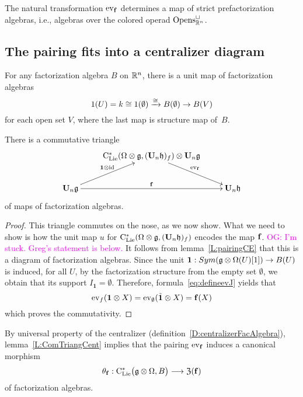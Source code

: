 \documentclass[11pt]{amsart}
\numberwithin{equation}{section}
\def\owen{\textcolor{magenta}{OG: }\textcolor{magenta}}
\begin{document}
\begin{lmm}
\label{L:pairingCE}
The natural transformation ${\rm ev}_{\bf{f}}$ determines a map of strict prefactorization algebras,
i.e., algebras over the colored operad ${\rm Opens}_{\mathbb R^n}^\sqcup$.
\end{lmm}

\subsection{The pairing fits into a centralizer diagram}

For any factorization algebra $B$ on $\mathbb R^n$, 
there is a unit map of factorization algebras  
\[
1(U) = k \cong 1(\emptyset)  \xrightarrow{\cong}
B(\emptyset) \to B(V)  
\] 
for each open set $V$, where the last map is structure map of~$B$. 

\begin{lmm}\label{L:ComTriangCent} 
There is a commutative triangle 
\[
\xymatrix{
& \clies ( \Omega \otimes \fg , (\bU_n \fh)_f) \otimes \bU_n \fg
\ar[dr]^{\ev_{\bf{f}}} & \\
\bU_n \fg \ar[ur]^{\mathbf{1} \otimes \id} \ar[rr]^{\mathbf{f}}  & &  \bU_n \fh}
\]
of maps of factorization algebras.
\end{lmm}

\begin{proof}
This triangle commutes on the nose, as we now show.
What we need to show is how the unit map $u$ for ${\rm C}_{\rm Lie}^* ( \Omega \otimes \mathfrak g , (\mathbf U_n \mathfrak h)_f)$ encodes the map $\bf{f}$.
\owen{I'm stuck. Greg's statement is below.}
 It follows from lemma~\ref{L:pairingCE} that this is a diagram of factorization algebras. Since the unit $\mathbf{1}:Sym(\mathfrak g \otimes \Omega(U)[1]) \to B(U)$ is induced, for all $U$, by the factorization structure from the empty set $\emptyset$, we obtain that its support $I_{\mathbf{1}}=\emptyset$. 
 Therefore, formula~\eqref{eq:defineevJ} yields that 
 \[{\rm ev}_{f} (\mathbf{1}\otimes X) = {\rm ev}_{\emptyset}(\tilde{\mathbf{1}}\otimes X) 
 = \mathbf{f}(X)\] which proves the commutativity.
\end{proof}

By universal property of the centralizer (definition~\ref{D:centralizerFacAlgebra}), lemma~\ref{L:ComTriangCent} implies that the pairing ${\rm ev}_{\bf{f}}$ induces a canonical morphism 
\begin{equation}
\label{eq:canonicaltocenter}
\theta_{\bf{f}}: {\rm C}_{\rm Lie}^*\big(\mathfrak g\otimes \Omega , B \big) \longrightarrow  {\frak Z}(\mathbf{f})
\end{equation}
of factorization algebras.
\end{document}
